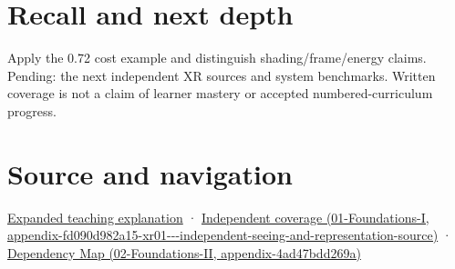 \section{Recall and next depth}\label{appendix-5878b813b732-recall-and-next-depth}

Apply the 0.72 cost example and distinguish shading/frame/energy claims. Pending: the next independent XR sources and system benchmarks. Written coverage is not a claim of learner mastery or accepted numbered-curriculum progress.

\section{Source and navigation}\label{appendix-5878b813b732-source-and-navigation}

\href{Continuous\%20Notes/University\%20-\%20Worlds,\%20Images\%20and\%20Inference\%20-\%20Graphics,\%20Vision\%20and\%20Photography\#Foveation\%20is\%20allocation\%20under\%20uncertain\%20perception\%20and\%20timing}{Expanded teaching explanation} · \href{../01-Foundations-I/main.pdf\#nameddest=appendix-fd090d982a15-xr01---independent-seeing-and-representation-source}{Independent coverage (01-Foundations-I, appendix-fd090d982a15-xr01-\/-\/-independent-seeing-and-representation-source)} · \href{../02-Foundations-II/main.pdf\#nameddest=appendix-4ad47bdd269a}{Dependency Map (02-Foundations-II, appendix-4ad47bdd269a)}
